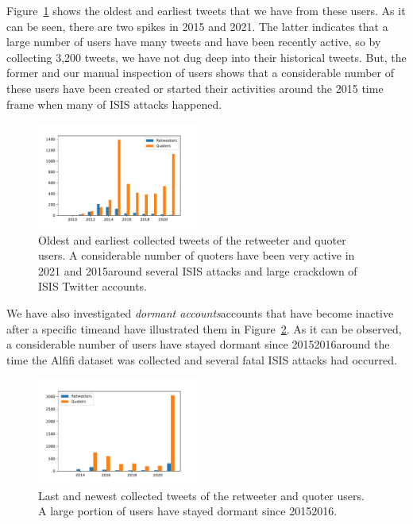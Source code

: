 \documentclass[letterpaper]{article}
\begin{document}
Figure~\ref{fig:first-activity} shows the oldest and earliest tweets that we have from these users. As it can be seen, there are two spikes in 2015 and 2021. The latter indicates that a large number of users have many tweets and have been recently active, so by collecting 3,200 tweets, we have not dug deep into their historical tweets. But, the former and our manual inspection of users shows that a considerable number of these users have been created or started their activities around the 2015 time frame when many of ISIS attacks happened.

\begin{figure}[ht]
\includegraphics[width=0.47\textwidth]{img/earliest-activity.pdf}
\caption{Oldest and earliest collected tweets of the retweeter and quoter users. A considerable number of quoters have been very active in 2021 and 2015around several ISIS attacks and large crackdown of ISIS Twitter accounts.}
\label{fig:first-activity}
\end{figure}

We have also investigated \textit{dormant accounts}accounts that have become inactive after a specific timeand have illustrated them in Figure~\ref{fig:last-activity}. As it can be observed, a considerable  number  of  users  have stayed dormant since 20152016around the time the Alfifi dataset was collected and several fatal ISIS attacks had occurred.

\begin{figure}[htbp]
\includegraphics[width=0.47\textwidth]{img/newest-activity.pdf}
\caption{Last and newest collected tweets of the retweeter and quoter users. A large portion of users have stayed dormant since 20152016.}
\label{fig:last-activity}
\end{figure}
\end{document}
